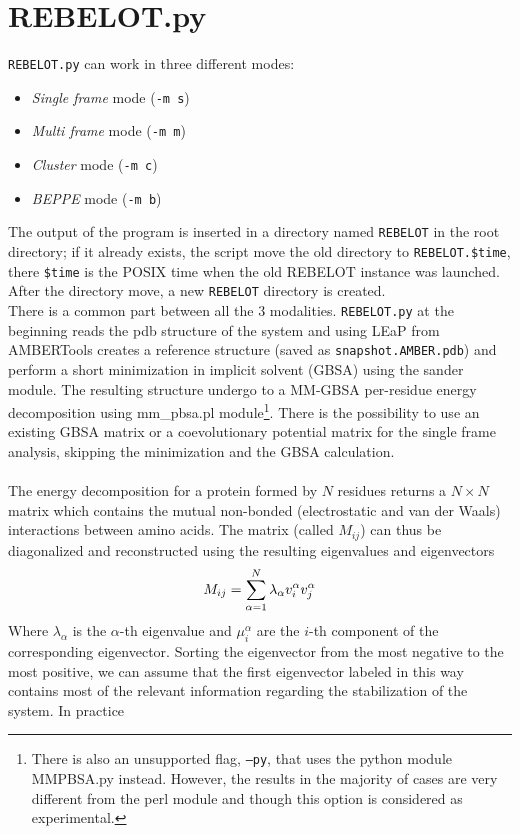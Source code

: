 \documentclass[a4paper,12pt]{book}
\begin{document}
\section{REBELOT.py}
\texttt{REBELOT.py} can work in three different modes:
\begin{itemize}
	\item \textit{Single frame} mode (\texttt{-m s})
	\item \textit{Multi frame} mode (\texttt{-m m})
	\item \textit{Cluster} mode (\texttt{-m c})
	\item \textit{BEPPE} mode (\texttt{-m b})
\end{itemize}
The output of the program is inserted in a directory named \texttt{REBELOT} in the root directory; if it already exists, the script move the old directory to \texttt{REBELOT.\$time}, there \texttt{\$time} is the POSIX time when the old REBELOT instance was launched. After the directory move, a new \texttt{REBELOT} directory is created. \\
There is a common part between all the 3 modalities. \texttt{REBELOT.py} at the beginning reads the pdb structure of the system and using LEaP from AMBERTools\cite{ambertools} creates a reference structure (saved as \texttt{snapshot.AMBER.pdb}) and perform a short minimization in implicit solvent (GBSA) using the sander module. The resulting structure undergo to a MM-GBSA per-residue energy decomposition using mm\_pbsa.pl module\footnote{There is also an unsupported flag, \texttt{--py}, that uses the python module MMPBSA.py instead. However, the results in the majority of cases are very different from the perl module and though this option is considered as experimental.}. There is the possibility to use an existing GBSA matrix or a coevolutionary potential matrix\cite{lui2013network,contini2015many} for the single frame analysis, skipping the minimization and the GBSA calculation. \\ \\
The energy decomposition for a protein formed by $N$ residues returns a $N \times N$ matrix which contains the mutual non-bonded (electrostatic and van der Waals) interactions between amino acids. The matrix (called $M_{ij}$) can thus be diagonalized and reconstructed using the resulting eigenvalues and eigenvectors
\begin{equation}
M_{ij} =  \sum_{\alpha=1}^{N} \lambda_{\alpha} v_{i}^{\alpha} v_{j}^{\alpha} \notag
\end{equation}
Where $\lambda_{\alpha}$ is the $\alpha$-th eigenvalue and $\mu_{i}^{\alpha}$ are the $i$-th component of the corresponding eigenvector. Sorting the eigenvector from the most negative to the most positive, we can assume \cite{tiana2004stability,morra2008relationship} that the first eigenvector labeled in this way contains most of the relevant information regarding the stabilization of the system. In practice
\end{document}
